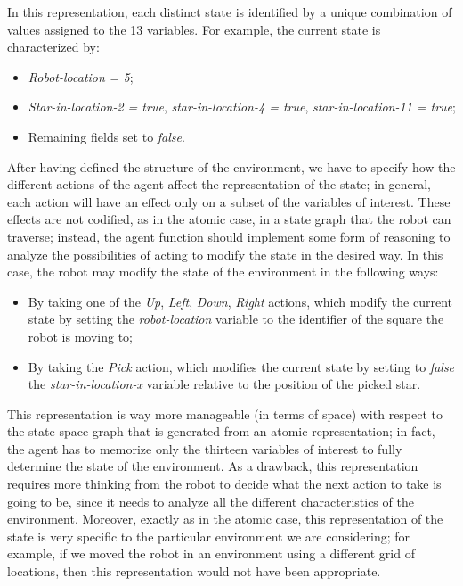 \documentclass[letterpaper,headings=standardclasses]{scrartcl}
\begin{document}
In this representation, each distinct state is identified by a unique combination of values assigned to the 13 variables. For example, the current state is characterized by:

\begin{itemize}

\item \emph{Robot-location = 5};
\item \emph{Star-in-location-2 = true}, \emph{star-in-location-4 = true}, \emph{star-in-location-11 = true};
\item Remaining fields set to \emph{false}.

\end{itemize}

After having defined the structure of the environment, we have to specify how the different actions of the agent affect the representation of the state; in general, each action will have an effect only on a subset of the variables of interest. These effects are not codified, as in the atomic case, in a state graph that the robot can traverse; instead, the agent function should implement some form of reasoning to analyze the possibilities of acting to modify the state in the desired way. In this case, the robot may modify the state of the environment in the following ways:

\begin{itemize}

\item By taking one of the \emph{Up}, \emph{Left}, \emph{Down}, \emph{Right} actions, which modify the current state by setting the \emph{robot-location} variable to the identifier of the square the robot is moving to;

\item By taking the \emph{Pick} action, which modifies the current state by setting to \emph{false} the \emph{star-in-location-x} variable relative to the position of the picked star.

\end{itemize}

This representation is way more manageable (in terms of space) with respect to the state space graph that is generated from an atomic representation; in fact, the agent has to memorize only the thirteen variables of interest to fully determine the state of the environment. As a drawback, this representation requires more thinking from the robot to decide what the next action to take is going to be, since it needs to analyze all the different characteristics of the environment. Moreover, exactly as in the atomic case, this representation of the state is very specific to the particular environment we are considering; for example, if we moved the robot in an environment using a different grid of locations, then this representation would not have been appropriate. 
\end{document}
